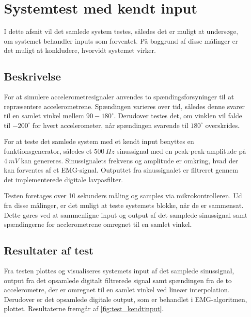 \section{Systemtest med kendt input} \label{sec:test_kendtinput}
I dette afsnit vil det samlede system testes, således det er muligt at undersøge, om systemet behandler inputs som forventet. På baggrund af disse målinger er det muligt at konkludere, hvorvidt systemet virker. 

\subsection{Beskrivelse}
For at simulere accelerometresignaler anvendes to spændingsforsyninger til at repræsentere accelerometrene. Spændingen varieres over tid, således denne svarer til en samlet vinkel mellem $90-180^{\circ}$. Derudover testes det, om vinklen vil falde til $-200^{\circ}$ for hvert accelerometer, når spændingen svarende til $180^{\circ}$ overskrides. 

For at teste det samlede system med et kendt input benyttes en funktionsgenerator, således et $500~Hz$ sinussignal med en peak-peak-amplitude på $4~mV$ kan genereres. Sinussignalets frekvens og amplitude er omkring, hvad der kan forventes af et EMG-signal. Outputtet fra sinussignalet er filtreret gennem det implementerede digitale lavpasfilter. 

Testen foretages over 10 sekunders måling og samples via mikrokontrolleren. Ud fra disse målinger, er det muligt at teste systemets blokke, når de er sammensat. Dette gøres ved at sammenligne input og output af det samplede sinussignal samt spændingerne for acclerometrene omregnet til en samlet vinkel.


\subsection{Resultater af test}
Fra testen plottes og visualiseres systemets input af det samplede sinussignal, output fra det opsamlede digitalt filtrerede signal samt spændingen fra de to accelerometre, der er omregnet til en samlet vinkel ved lineær interpolation. Derudover er det opsamlede digitale output, som er behandlet i EMG-algoritmen, plottet. Resultaterne fremgår af \autoref{fig:test_kendtinput}. 

